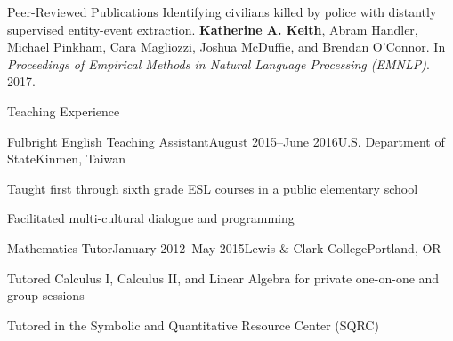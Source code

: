 \documentclass{resume} %
\begin{document}
%
\begin{rSection}{Peer-Reviewed Publications}
Identifying civilians killed by police with distantly supervised entity-event extraction. 
\textbf{Katherine A. Keith}, Abram Handler, Michael Pinkham, Cara Magliozzi, Joshua McDuffie, and Brendan O'Connor. In \emph{Proceedings of Empirical Methods in Natural Language Processing (EMNLP)}. 2017. 

\end{rSection}


\begin{rSection}{Teaching Experience}

\begin{rSubsection}{Fulbright English Teaching Assistant}{August 2015--June 2016}{U.S. Department of State}{Kinmen, Taiwan}
\item Taught first through sixth grade ESL courses in a public elementary school
\item Facilitated multi-cultural dialogue and programming
\end{rSubsection}

\begin{rSubsection}{Mathematics Tutor}{January 2012--May 2015}{Lewis \& Clark College}{Portland, OR}
\item Tutored Calculus I, Calculus II, and Linear Algebra for private one-on-one and group sessions
\item Tutored in the Symbolic and Quantitative Resource Center (SQRC) 
\end{rSubsection}

\end{rSection}

\end{document}
